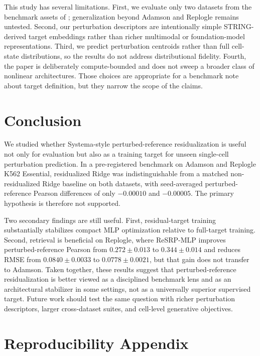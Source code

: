 \documentclass{article}
\begin{document}
This study has several limitations. First, we evaluate only two datasets from the benchmark assets of \citet{wei2026benchmarking}; generalization beyond Adamson and Replogle remains untested. Second, our perturbation descriptors are intentionally simple STRING-derived target embeddings rather than richer multimodal or foundation-model representations. Third, we predict perturbation centroids rather than full cell-state distributions, so the results do not address distributional fidelity. Fourth, the paper is deliberately compute-bounded and does not sweep a broader class of nonlinear architectures. Those choices are appropriate for a benchmark note about target definition, but they narrow the scope of the claims.

\section{Conclusion}
\label{sec:conclusion}

We studied whether Systema-style perturbed-reference residualization is useful not only for evaluation but also as a training target for unseen single-cell perturbation prediction. In a pre-registered benchmark on Adamson and Replogle K562 Essential, residualized Ridge was indistinguishable from a matched non-residualized Ridge baseline on both datasets, with seed-averaged perturbed-reference Pearson differences of only $-0.00010$ and $-0.00005$. The primary hypothesis is therefore not supported.

Two secondary findings are still useful. First, residual-target training substantially stabilizes compact MLP optimization relative to full-target training. Second, retrieval is beneficial on Replogle, where ReSRP-MLP improves perturbed-reference Pearson from $0.272 \pm 0.013$ to $0.344 \pm 0.014$ and reduces RMSE from $0.0840 \pm 0.0033$ to $0.0778 \pm 0.0021$, but that gain does not transfer to Adamson. Taken together, these results suggest that perturbed-reference residualization is better viewed as a disciplined benchmark lens and as an architectural stabilizer in some settings, not as a universally superior supervised target. Future work should test the same question with richer perturbation descriptors, larger cross-dataset suites, and cell-level generative objectives.

\appendix
\section{Reproducibility Appendix}
\label{sec:appendix-repro}
\end{document}

